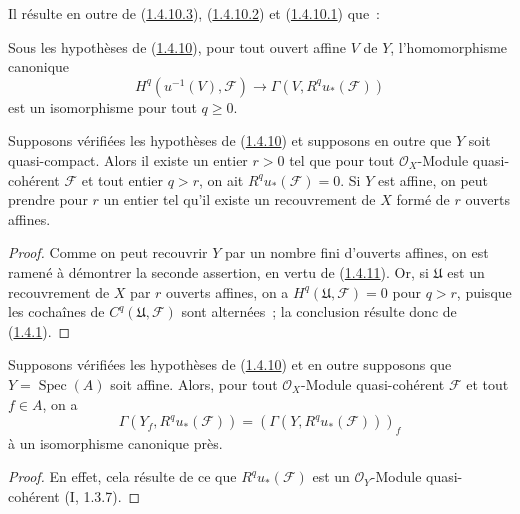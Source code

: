 Il résulte en outre de (\hyperref[III.1.4.10.3-fr]{1.4.10.3}),
(\hyperref[III.1.4.10.2-fr]{1.4.10.2}) et
(\hyperref[III.1.4.10.1-fr]{1.4.10.1}) que~:

\begin{corollary}[1.4.11]
\label{III.1.4.11-fr}
Sous les hypothèses de (\hyperref[III.1.4.10-fr]{1.4.10}), pour tout ouvert
affine $V$ de $Y$, l'homomorphisme canonique
\begin{equation}
\label{III.1.4.11.1-fr}
\tag{1.4.11.1}
H^q(u^{-1}(V),\mathcal F)\longrightarrow
\Gamma(V,R^qu_*(\mathcal F))
\end{equation}
est un isomorphisme pour tout $q\geq0$.
\end{corollary}

\begin{corollary}[1.4.12]
\label{III.1.4.12-fr}
Supposons vérifiées les hypothèses de
(\hyperref[III.1.4.10-fr]{1.4.10}) et supposons en outre que $Y$ soit
quasi-compact. Alors il existe un entier $r>0$ tel que pour tout
$\mathcal O_X$-Module quasi-cohérent $\mathcal F$ et tout entier $q>r$, on
ait $R^qu_*(\mathcal F)=0$. Si $Y$ est affine, on peut prendre pour $r$ un
entier tel qu'il existe un recouvrement de $X$ formé de $r$ ouverts affines.
\end{corollary}

\begin{proof}
Comme on peut recouvrir $Y$ par un nombre fini d'ouverts affines, on est
ramené à démontrer la seconde assertion, en vertu de
(\hyperref[III.1.4.11-fr]{1.4.11}). Or, si $\mathfrak U$ est un
recouvrement de $X$ par $r$ ouverts affines, on a
$H^q(\mathfrak U,\mathcal F)=0$ pour $q>r$, puisque les cochaînes de
$C^q(\mathfrak U,\mathcal F)$ sont alternées~; la conclusion résulte donc de
(\hyperref[III.1.4.1-fr]{1.4.1}).
\end{proof}

\begin{corollary}[1.4.13]
\label{III.1.4.13-fr}
Supposons vérifiées les hypothèses de
(\hyperref[III.1.4.10-fr]{1.4.10}) et en outre supposons que
$Y=\operatorname{Spec}(A)$ soit affine. Alors, pour tout
$\mathcal O_X$-Module quasi-cohérent $\mathcal F$ et tout $f\in A$, on a
\[
\Gamma(Y_f,R^qu_*(\mathcal F))
=(\Gamma(Y,R^qu_*(\mathcal F)))_f
\]
à un isomorphisme canonique près.
\end{corollary}

\begin{proof}
En effet, cela résulte de ce que $R^qu_*(\mathcal F)$ est un
$\mathcal O_Y$-Module quasi-cohérent (I, 1.3.7).
\end{proof}

